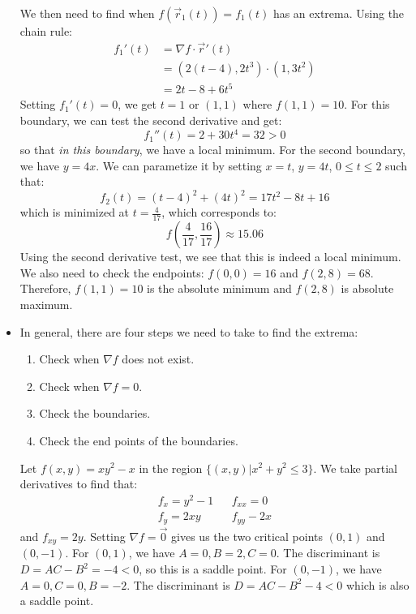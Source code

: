 \begin{itemize}
\begin{example}
\begin{equation}
        \end{equation}
        We then need to find when $f(\vec{r}_1(t)) = f_1(t)$ has an extrema. Using the chain rule:
        \begin{align}
            f_1'(t) &= \nabla f \cdot \vec{r}'(t) \\ 
            &= (2(t-4), 2t^3) \cdot (1, 3t^2) \\ 
            &= 2t-8+6t^5
        \end{align}
        Setting $f_1'(t)=0$, we get $t=1$ or $(1,1)$ where $f(1,1) = 10$. For this boundary, we can test the second derivative and get:
        \begin{equation}
            f_1''(t) = 2 + 30t^4 = 32 > 0
        \end{equation}
        so that \textit{in this boundary}, we have a local minimum. For the second boundary, we have $y=4x$. We can parametize it by setting $x=t$, $y=4t$, $0 \le t \le 2$ such that:
        \begin{equation}
            f_2(t) = (t-4)^2 + (4t)^2 = 17t^2 - 8t + 16
        \end{equation}
        which is minimized at $t=\frac{4}{17}$, which corresponds to:
        \begin{equation}
            f\left(\frac{4}{17}, \frac{16}{17}\right) \approx 15.06
        \end{equation}
        Using the second derivative test, we see that this is indeed a local minimum. We also need to check the endpoints: $f(0,0) = 16$ and $f(2,8)=68$. Therefore, $f(1,1)=10$ is the absolute minimum and $f(2,8)$ is absolute maximum.
    \end{example}
    \item In general, there are four steps we need to take to find the extrema:
    \begin{enumerate}
        \item Check when $\nabla f$ does not exist.
        \item Check when $\nabla f = 0$.
        \item Check the boundaries.
        \item Check the end points of the boundaries.
    \end{enumerate}
    \begin{example}
        Let $f(x,y) = xy^2 - x$ in the region $\{(x,y) | x^2 +y ^2 \le 3\}$. We take partial derivatives to find that:
        \begin{align}
            f_x = y^2-1 && f_{xx} = 0 \\ 
            f_y = 2xy && f_{yy} - 2x
        \end{align}
        and $f_{xy}=2y$. Setting $\nabla f = \vec{0}$ gives us the two critical points $(0,1)$ and $(0,-1)$. For $(0,1)$, we have $A=0, B=2, C=0$. The discriminant is $D=AC-B^2 = -4 < 0$, so this is a saddle point. For $(0,-1)$, we have $A=0, C=0, B=-2$. The discriminant is $D=AC-B^2-4 < 0$ which is also a saddle point.
        \vspace{2mm}


\end{example}
\end{itemize}
